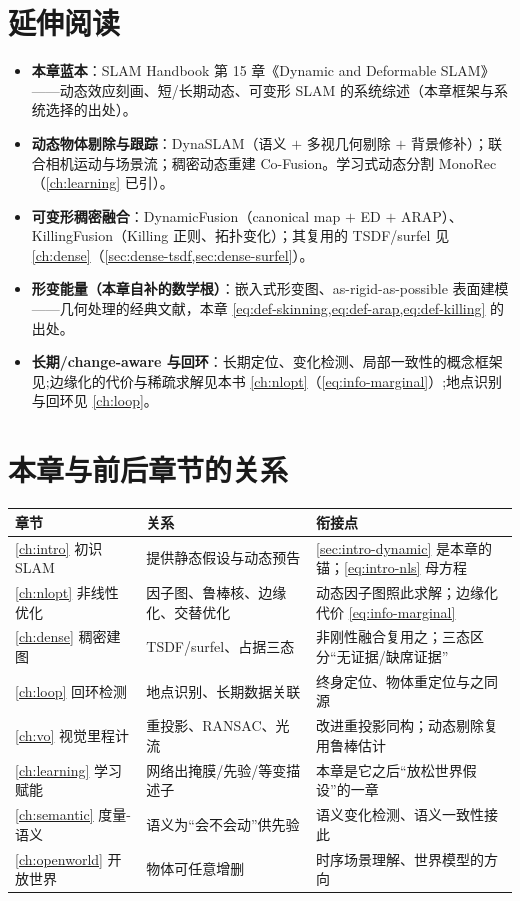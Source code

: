 \section*{延伸阅读}
\begin{itemize}
  \item \textbf{本章蓝本}：SLAM Handbook\cite{schmid2026dynamic} 第 15 章《Dynamic and Deformable SLAM》——动态效应刻画、短/长期动态、可变形 SLAM 的系统综述（本章框架与系统选择的出处）。
  \item \textbf{动态物体剔除与跟踪}：DynaSLAM\cite{bescos2018dynaslam}（语义 $+$ 多视几何剔除 $+$ 背景修补）；联合相机运动与场景流\cite{jaimez2017fast}；稠密动态重建 Co-Fusion\cite{runz2017cofusion}。学习式动态分割 MonoRec\cite{wimbauer2021monorec}（\cref{ch:learning} 已引）。
  \item \textbf{可变形稠密融合}：DynamicFusion\cite{newcombe2015dynamicfusion}（canonical map $+$ ED $+$ ARAP）、KillingFusion\cite{slavcheva2017killingfusion}（Killing 正则、拓扑变化）；其复用的 TSDF/surfel 见 \cref{ch:dense}（\cref{sec:dense-tsdf,sec:dense-surfel}）。
  \item \textbf{形变能量（本章自补的数学根）}：嵌入式形变图\cite{sumner2007embedded}、as-rigid-as-possible 表面建模\cite{sorkine2007arap}——几何处理的经典文献，本章 \cref{eq:def-skinning,eq:def-arap,eq:def-killing} 的出处。
  \item \textbf{长期/change-aware 与回环}：长期定位、变化检测、局部一致性的概念框架见\cite{schmid2026dynamic};边缘化的代价与稀疏求解见本书 \cref{ch:nlopt}（\cref{eq:info-marginal}）;地点识别与回环见 \cref{ch:loop}。
\end{itemize}

\section*{本章与前后章节的关系}
\begin{table}[H]\centering\small
\begin{tabular}{lll}
\toprule
章节 & 关系 & 衔接点 \\
\midrule
\cref{ch:intro} 初识 SLAM & 提供静态假设与动态预告 & \cref{sec:intro-dynamic} 是本章的锚；\cref{eq:intro-nls} 母方程 \\
\cref{ch:nlopt} 非线性优化 & 因子图、鲁棒核、边缘化、交替优化 & 动态因子图照此求解；边缘化代价 \cref{eq:info-marginal} \\
\cref{ch:dense} 稠密建图 & TSDF/surfel、占据三态 & 非刚性融合复用之；三态区分“无证据/缺席证据” \\
\cref{ch:loop} 回环检测 & 地点识别、长期数据关联 & 终身定位、物体重定位与之同源 \\
\cref{ch:vo} 视觉里程计 & 重投影、RANSAC、光流 & 改进重投影同构；动态剔除复用鲁棒估计 \\
\cref{ch:learning} 学习赋能 & 网络出掩膜/先验/等变描述子 & 本章是它之后“放松世界假设”的一章 \\
\cref{ch:semantic} 度量-语义 & 语义为“会不会动”供先验 & 语义变化检测、语义一致性接此 \\
\cref{ch:openworld} 开放世界 & 物体可任意增删 & 时序场景理解、世界模型的方向 \\
\bottomrule
\end{tabular}
\end{table}

